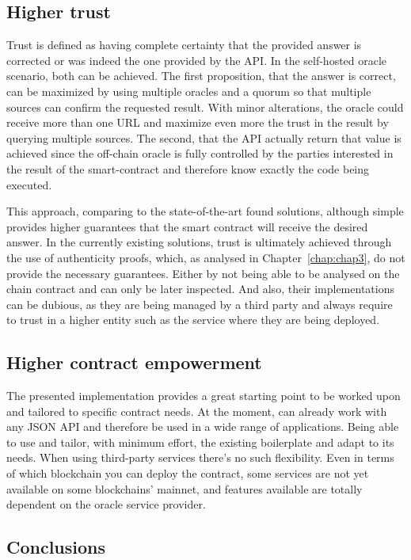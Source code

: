 \subsection{Higher trust}

Trust is defined as having complete certainty that the provided answer is corrected or was indeed the one provided by the API. In the self-hosted oracle scenario, both can be achieved. The first proposition, that the answer is correct, can be maximized by using multiple oracles and a quorum so that multiple sources can confirm the requested result. With minor alterations, the oracle could receive more than one URL and maximize even more the trust in the result by querying multiple sources. The second, that the API actually return that value is achieved since the off-chain oracle is fully controlled by the parties interested in the result of the smart-contract and therefore know exactly the code being executed.

This approach, comparing to the state-of-the-art found solutions, although simple provides higher guarantees that the smart contract will receive the desired answer. In the currently existing solutions, trust is ultimately achieved through the use of authenticity proofs, which, as analysed in Chapter~\ref{chap:chap3}, do not provide the necessary guarantees. Either by not being able to be analysed on the chain contract and can only be later inspected. And also, their implementations can be dubious, as they are being managed by a third party and always require to trust in a higher entity such as the service where they are being deployed.

\subsection{Higher contract empowerment}

The presented implementation provides a great starting point to be worked upon and tailored to specific contract needs. At the moment, can already work with any JSON API and therefore be used in a wide range of applications. Being able to use and tailor, with minimum effort, the existing boilerplate and adapt to its needs. When using third-party services there's no such flexibility. Even in terms of which blockchain you can deploy the contract, some services are not yet available on some blockchains' mainnet, and features available are totally dependent on the oracle service provider.

\subsection{Conclusions}

